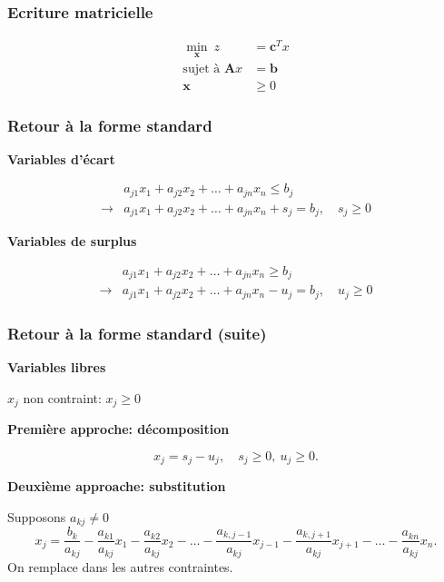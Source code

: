 \documentclass[usepdftitle=false]{beamer}
\def\bb{\boldsymbol{b}}
\def\bc{\boldsymbol{c}}
\def\bx{\boldsymbol{x}}
\def\bA{\boldsymbol{A}}
\begin{document}
\begin{frame}
\frametitle{Ecriture matricielle}

\begin{align*}
\min_{\bx} \ z &= \bc^T x \\
\mbox{sujet à } \bA x &= \bb \\
\bx & \geq 0
\end{align*}

\end{frame}

\begin{frame}
\frametitle{Retour à la forme standard}

{\bf Variables d'écart}

\begin{align*}
& a_{j1}x_1 + a_{j2}x_2 + \ldots + a_{jn}x_n \leq b_j \\
\rightarrow & a_{j1}x_1 + a_{j2}x_2 + \ldots + a_{jn}x_n + s_j = b_j, \quad s_j \geq 0 \end{align*}

\mbox{}

{\bf Variables de surplus}

\begin{align*}
& a_{j1}x_1 + a_{j2}x_2 + \ldots + a_{jn}x_n \geq b_j \\
\rightarrow & a_{j1}x_1 + a_{j2}x_2 + \ldots + a_{jn}x_n - u_j = b_j, \quad u_j \geq 0 \end{align*}

\end{frame}

\begin{frame}
\frametitle{Retour à la forme standard (suite)}

{\bf Variables libres}

$x_j$ non contraint: \sout{$x_j \geq 0$}

\mbox{}

{\bf Première approche: décomposition}

\[
x_j = s_j - u_j,\quad s_j \geq 0,\ u_j \geq 0.
\]

\mbox{}

{\bf Deuxième approache: substitution}

Supposons $a_{kj} \ne 0$
\[
x_j = \frac{b_k}{a_{kj}} - \frac{a_{k1}}{a_{kj}}x_1 - \frac{a_{k2}}{a_{kj}}x_2 - \ldots - \frac{a_{k,j-1}}{a_{kj}}x_{j-1} - \frac{a_{k,j+1}}{a_{kj}}x_{j+1} -  \ldots - \frac{a_{kn}}{a_{kj}}x_n.
\]
On remplace dans les autres contraintes.

\end{frame}
\end{document}
